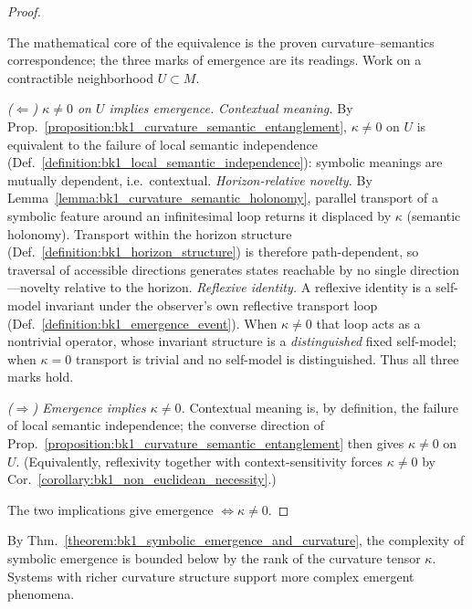 \begin{proof}
\label{proof:bk1_symbolic_emergence_and_curvature}
\leavevmode

The mathematical core of the equivalence is the proven curvature--semantics correspondence; the three marks of emergence are its readings. Work on a contractible neighborhood $U \subset M$.

\emph{($\Leftarrow$) $\kappa \neq 0$ on $U$ implies emergence.}
\emph{Contextual meaning.} By Prop.~\ref{proposition:bk1_curvature_semantic_entanglement}, $\kappa \neq 0$ on $U$ is equivalent to the failure of local semantic independence (Def.~\ref{definition:bk1_local_semantic_independence}): symbolic meanings are mutually dependent, i.e.\ contextual.
\emph{Horizon-relative novelty.} By Lemma~\ref{lemma:bk1_curvature_semantic_holonomy}, parallel transport of a symbolic feature around an infinitesimal loop returns it displaced by $\kappa$ (semantic holonomy). Transport within the horizon structure (Def.~\ref{definition:bk1_horizon_structure}) is therefore path-dependent, so traversal of accessible directions generates states reachable by no single direction---novelty relative to the horizon.
\emph{Reflexive identity.} A reflexive identity is a self-model invariant under the observer's own reflective transport loop (Def.~\ref{definition:bk1_emergence_event}). When $\kappa \neq 0$ that loop acts as a nontrivial operator, whose invariant structure is a \emph{distinguished} fixed self-model; when $\kappa = 0$ transport is trivial and no self-model is distinguished. Thus all three marks hold.

\emph{($\Rightarrow$) Emergence implies $\kappa \neq 0$.}
Contextual meaning is, by definition, the failure of local semantic independence; the converse direction of Prop.~\ref{proposition:bk1_curvature_semantic_entanglement} then gives $\kappa \neq 0$ on $U$. (Equivalently, reflexivity together with context-sensitivity forces $\kappa \neq 0$ by Cor.~\ref{corollary:bk1_non_euclidean_necessity}.)

The two implications give emergence $\iff \kappa \neq 0$.
\end{proof}

\begin{corollary}
\label{corollary:bk1_dimensional_bounds_emergence}
By Thm.~\ref{theorem:bk1_symbolic_emergence_and_curvature}, the complexity of symbolic emergence is bounded below by the rank of the curvature tensor $\kappa$. Systems with richer curvature structure support more complex emergent phenomena.
\end{corollary}

